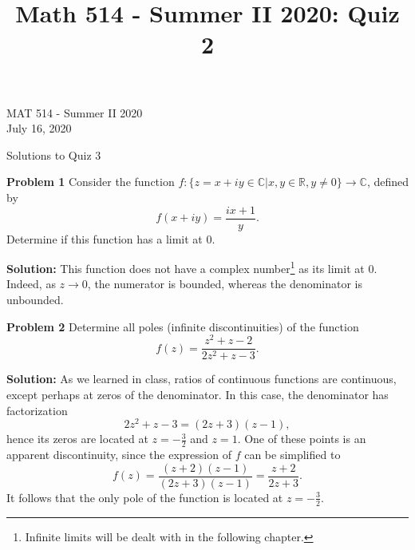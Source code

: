 \documentclass[12pt,oneside]{exam}
\title{Math 514 - Summer II 2020: Quiz 2}
\newenvironment{exercise}[1]{\vspace{.1in}\noindent\textbf{Problem #1 \hspace{.05em}}}{}
\newcommand{\func}[3]{{#1} : {#2} \longrightarrow {#3}}
\begin{document}
\begin{flushright}
\sc MAT 514 - Summer II 2020\\
July 16, 2020
\end{flushright}
\bigskip
 
\begin{center}
\textsf{Solutions to Quiz 3} 
\end{center}


\begin{exercise}{1}
Consider the function $\func{f}{\{z = x + iy \in \mathbb{C}| x,y \in \mathbb{R}, y \neq 0\}}{\mathbb{C}}$, defined by 
\begin{equation*}
f(x+iy) = \frac{ix+1}{y}.
\end{equation*}
Determine if this function has a limit at $0$. 
\end{exercise}

\textbf{Solution:}
This function does not have a complex number\footnote{Infinite limits will be dealt with in the following chapter.} as its limit at $0$. Indeed, as $z \to 0$, the numerator is bounded, whereas the denominator is unbounded. 
\vfill

\begin{exercise}{2}
Determine all poles (infinite discontinuities) of the function
\begin{equation*}
f(z) = \frac{z^2+z-2}{2z^2+z-3}.
\end{equation*}
\end{exercise}


\textbf{Solution:} As we learned in class, ratios of continuous functions are continuous, except perhaps at zeros of the denominator. In this case, the denominator has factorization
\begin{equation*}
2z^2+z-3 = (2z+3)(z-1),
\end{equation*}
hence its zeros are located at $z=-\frac{3}{2}$ and $z=1$. One of these points is an apparent discontinuity, since the expression of $f$ can be simplified to 
\begin{equation*}
f(z) = \frac{(z+2)(z-1)}{(2z+3)(z-1)} = \frac{z+2}{2z+3}.
\end{equation*}
It follows that the only pole of the function is located at $z=-\frac{3}{2}$. 
\vfill
\end{document}
